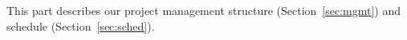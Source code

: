 
This part describes our project management structure (Section~\ref{sec:mgmt}) and schedule (Section~\ref{sec:sched}).